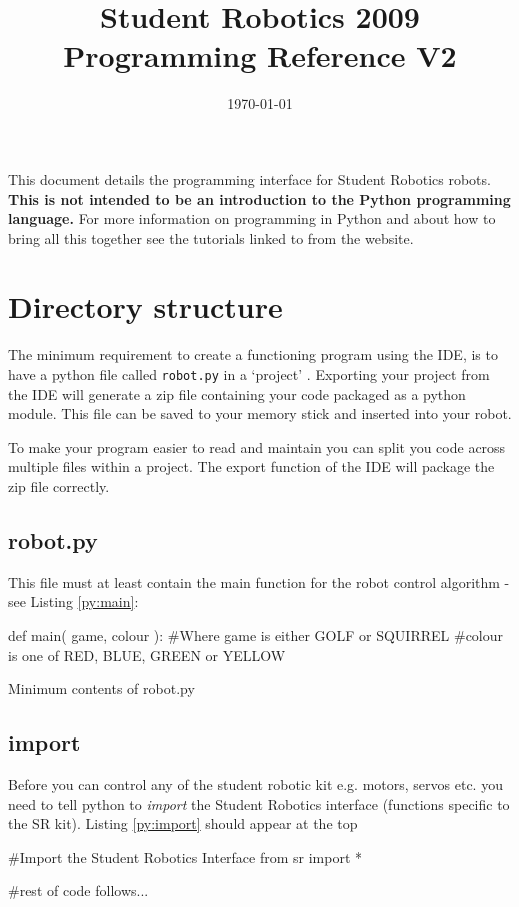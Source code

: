\documentclass[a4paper, 12pt]{article}
\title {Student Robotics 2009\\ Programming Reference V2}
\date{\today}
\begin{document}
\maketitle

\noindent This document details the programming interface for Student Robotics
robots. {\bf This is not intended to be an introduction to the Python programming language.} For more information on programming in Python and about how to bring all this together see the tutorials linked to from the website. 

\section{Directory structure}
The minimum  requirement to create a functioning program using the IDE, is to have a python file called \texttt{robot.py} in a `project' . Exporting your project from the IDE will generate a zip file containing your code packaged as a python module. This file can be saved to your memory stick and inserted into your robot.

To make your program easier to read and maintain you can split you code across multiple files within a project. The export function of the IDE will package the zip file correctly.

\subsection{robot.py}
This file must at least contain the main function for the robot control
algorithm - see Listing \ref{py:main}:

\begin{python}
\begin{verbatimtab}
def main( game, colour ):
    #Where game is either GOLF or SQUIRREL
    #colour is one of RED, BLUE, GREEN or YELLOW
\end{verbatimtab}
  \caption{\label{py:main}Minimum contents of robot.py} 
\end{python}

\subsection{import}
Before you can control any of the student robotic kit e.g. motors, servos etc. you need to tell python to \textit{import} the Student Robotics interface (functions specific to the SR kit). Listing \ref{py:import} should appear at the top
\begin{python}
\begin{verbatimtab}
#Import the Student Robotics Interface	
from sr import *

#rest of code follows...
\end{verbatimtab}
  \caption{\label{py:import}} 
\end{python}
\end{document}
